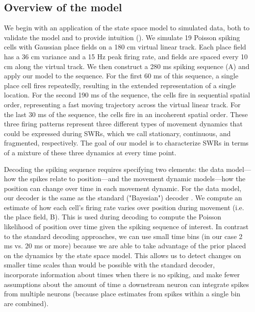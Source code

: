 \documentclass[9pt,lineno]{elife}
\begin{document}
\subsection*{Overview of the model}
We begin with an application of the state space model to simulated data, both to validate the model and to provide intuition (). We simulate 19 Poisson spiking cells with Gaussian place fields on a 180 cm virtual linear track. Each place field has a 36 cm variance and a 15 Hz peak firing rate, and fields are spaced every 10 cm along the virtual track. We then construct a 280 ms spiking sequence (A) and apply our model to the sequence. For the first 60 ms of this sequence, a single place cell fires repeatedly, resulting in the extended representation of a single location. For the second 190 ms of the sequence, the cells fire in sequential spatial order, representing a fast moving trajectory across the virtual linear track. For the last 30 ms of the sequence, the cells fire in an incoherent spatial order. These three firing patterns represent three different types of movement dynamics that could be expressed during SWRs, which we call stationary, continuous, and fragmented, respectively. The goal of our model is to characterize SWRs in terms of a mixture of these three dynamics at every time point.

Decoding the spiking sequence requires specifying two elements: the data model---how the spikes relate to position---and the movement dynamic models---how the position can change over time in each movement dynamic. For the data model, our decoder is the same as the standard ("Bayesian") decoder \citep{DavidsonHippocampalReplayExtended2009, PfeifferAutoassociativedynamicsgeneration2015, StellaHippocampalReactivationRandom2019}. We compute an estimate of how each cell's firing rate varies over position during movement (i.e. the place field, B). This is used during decoding to compute the Poisson likelihood of position over time given the spiking sequence of interest. In contrast to the standard decoding approaches, we can use small time bins (in our case 2 ms vs. 20 ms or more) because we are able to take advantage of the prior placed on the dynamics by the state space model. This allows us to detect changes on smaller time scales than would be possible with the standard decoder, incorporate information about times when there is no spiking, and make fewer assumptions about the amount of time a downstream neuron can integrate spikes from multiple neurons (because place estimates from spikes within a single bin are combined).
\end{document}
